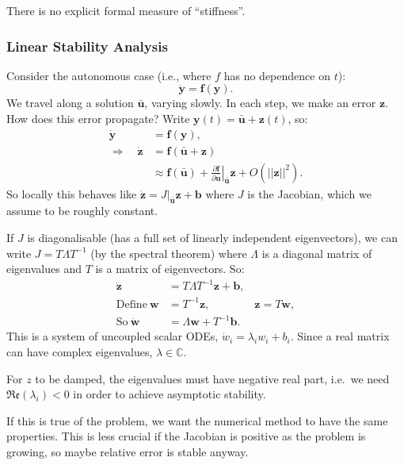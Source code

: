 \documentclass[12pt, a4paper]{article}
\theoremstyle{definition}
\theoremstyle{remark}
\numberwithin{equation}{section}
\begin{document}
There is no explicit formal measure of ``stiffness''.

\newpage
\subsubsection{Linear Stability Analysis}

Consider the autonomous case (i.e., where $f$ has no dependence on $t$):
$$ \mathbf{\dot y} = \mathbf{f}(\mathbf{y}). $$
We travel along a solution $\mathbf{\bar u}$, varying slowly. In each step,
we make an error $\mathbf z$. How does this error propagate? Write $\mathbf y(t) = \mathbf{\bar u} + \mathbf z(t)$,
so:
\begin{align*}
\mathbf{\dot y} &= \mathbf f(\mathbf y), \\
\Longrightarrow \quad \mathbf{\dot z} &= \mathbf f(\mathbf{\bar u} + \mathbf z) \\
&\approx \mathbf f(\mathbf{\bar u}) + \left.\frac{\partial \mathbf f}{\partial \mathbf{\bar u}}\right|_\mathbf{\bar u} \mathbf z + O(||\mathbf z||^2).
\end{align*}
So locally this behaves like $\mathbf{\dot z} = J|_{\mathbf{\bar u}} \mathbf z + \mathbf b$
where $J$ is the Jacobian, which we assume to be roughly constant.

If $J$ is diagonalisable (has a full set of linearly independent eigenvectors),
we can write $J = T \Lambda T^{-1}$ (by the spectral theorem) where $\Lambda$
is a diagonal matrix of eigenvalues and $T$ is a matrix of eigenvectors.
So:
\begin{align*}
\mathbf{\dot z} &= T\Lambda T^{-1} \mathbf{z} + \mathbf{b}, \\
\text{Define}\ \mathbf{w} &= T^{-1} \mathbf{z}, \qquad \qquad \mathbf{z} = T\mathbf{w},\\
\text{So}\ \mathbf{\dot w} &= \Lambda \mathbf{w} + T^{-1} \mathbf{b}.
\end{align*}
This is a system of uncoupled scalar ODEs, $\dot{w}_i = \lambda_i w_i + b_i$.
Since a real matrix can have complex eigenvalues, $\lambda \in \mathbb{C}$.

For $z$ to be damped, the eigenvalues must have negative real part, i.e.~we need
$\mathfrak{Re}(\lambda_i) < 0$ in order to achieve asymptotic stability.

If this is true of the problem, we want the numerical method to have the same properties.
This is less crucial if the Jacobian is positive as the problem is growing, so
maybe relative error is stable anyway.
\end{document}
